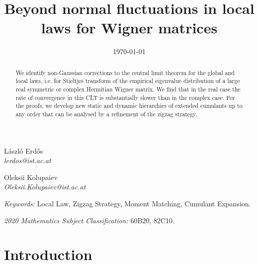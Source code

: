 \documentclass[10pt]{amsart}
\title[Beyond normal fluctuations]{Beyond normal fluctuations in local laws for Wigner matrices}
\date{\today}
\numberwithin{equation}{section}
\begin{document}
\maketitle

\vspace{0.25cm}

\renewcommand{\thefootnote}{\fnsymbol{footnote}}	


\noindent
\mbox{}%
\hfill%
\begin{minipage}{0.21\textwidth}
	\centering
	{L\'aszl\'o Erd\H{o}s}\footnotemark[1]\\
	\footnotesize{\textit{lerdos@ist.ac.at}}
\end{minipage}
\hfill%
\begin{minipage}{0.21\textwidth}
	\centering
	{Oleksii Kolupaiev}\footnotemark[1]\\
	\footnotesize{\textit{Oleksii.Kolupaiev@ist.ac.at}}
\end{minipage}
\hfill%
\mbox{}%
%

\renewcommand*{\thefootnote}{\arabic{footnote}}
\vspace{0.25cm}

\begin{abstract}  We identify non-Gaussian corrections to the central limit theorem for the global and  local laws, i.e. for Stieltjes transform of the empirical eigenvalue distribution of a large real symmetric or complex Hermitian Wigner matrix. We find that in the real case the rate of convergence in this CLT is substantially slower than in the complex case. For the proofs, we develop new static and dynamic hierarchies of extended cumulants
up to any order that can be analysed by a refinement of the zigzag strategy.
\end{abstract}
\vspace{0.15cm}

\footnotesize \textit{Keywords:} Local Law, Zigzag Strategy, Moment Matching, Cumulant Expansion.

\footnotesize \textit{2020 Mathematics Subject Classification:} 60B20, 82C10.
%
\vspace{0.25cm}
%
\normalsize



\section{Introduction}
\end{document}
